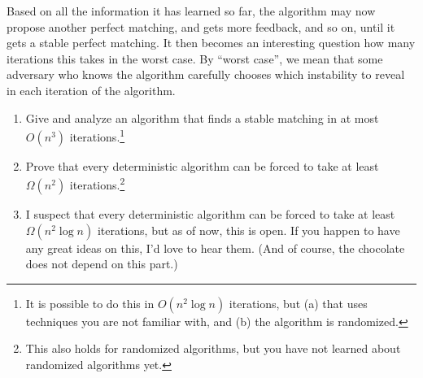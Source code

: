 \documentclass[10pt]{article}
\begin{document}
Based on all the information it has learned so far, the algorithm may now propose another perfect matching, and gets more feedback, and so on, until it gets a stable perfect matching.
It then becomes an interesting question how many iterations this takes in the worst case. By ``worst case'', we mean that some adversary who knows the algorithm carefully chooses which instability to reveal in each iteration of the algorithm.

\begin{enumerate}
\item Give and analyze an algorithm that finds a stable matching in at most $O(n^3)$ iterations.\footnote{It is possible to do this in $O(n^2 \log n)$ iterations, but (a) that uses techniques you are not familiar with, and (b) the algorithm is randomized.}
\item Prove that every deterministic algorithm can be forced to take at least $\Omega(n^2)$ iterations.\footnote{This also holds for randomized algorithms, but you have not learned about randomized algorithms yet.}
\item I suspect that every deterministic algorithm can be forced to take at least $\Omega(n^2 \log n)$ iterations, but as of now, this is open. If you happen to have any great ideas on this, I'd love to hear them. (And of course, the chocolate does not depend on this part.)
\end{enumerate}
\end{document}
